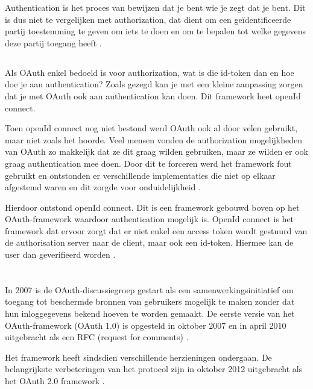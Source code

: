 Authentication is het proces van bewijzen dat je bent wie je zegt dat je bent. Dit is dus niet te vergelijken met authorization, dat dient om een geïdentificeerde partij toestemming te geven om iets te doen en om te bepalen tot welke gegevens deze partij toegang heeft \autocite{rwike772020}.

\subsection{}
Als OAuth enkel bedoeld is voor authorization, wat is die id-token dan en hoe doe je aan authentication? Zoals gezegd kan je met een kleine aanpassing zorgen dat je met OAuth ook aan authentication kan doen. Dit framework heet openId connect. \autocite{rwike772019} \autocite{rwike772019a}

Toen openId connect nog niet bestond werd OAuth ook al door velen gebruikt, maar niet zoals het hoorde. Veel mensen vonden de authorization mogelijkheden van OAuth zo makkelijk dat ze dit graag wilden gebruiken, maar ze wilden er ook graag authentication mee doen. Door dit te forceren werd het framework fout gebruikt en ontstonden er verschillende implementaties die niet op elkaar afgestemd waren en dit zorgde voor onduidelijkheid \autocite{rwike772019} \autocite{rwike772019a}.

Hierdoor ontstond openId connect. Dit is een framework gebouwd boven op het OAuth-framework waardoor authentication mogelijk is. OpenId connect is het framework dat ervoor zorgt dat er niet enkel een access token wordt gestuurd van de authorisation server naar de client, maar ook een id-token. Hiermee kan de user dan geverifieerd worden \autocite{rwike772019} \autocite{rwike772019a}.

\section{}
\label{sec:OAuthHistory}
In 2007 is de OAuth-discussiegroep gestart als een samenwerkingsinitiatief om toegang tot beschermde bronnen van gebruikers mogelijk te maken zonder dat hun inloggegevens bekend hoeven te worden gemaakt. De eerste versie van het OAuth-framework (OAuth 1.0) is opgesteld in oktober 2007 en in april 2010 uitgebracht als een RFC (request for comments) \autocite{Chen2014}.

Het framework heeft sindsdien verschillende herzieningen ondergaan. De belangrijkste verbeteringen van het protocol zijn in oktober 2012 uitgebracht als het OAuth 2.0 framework \autocite{Chen2014}.

